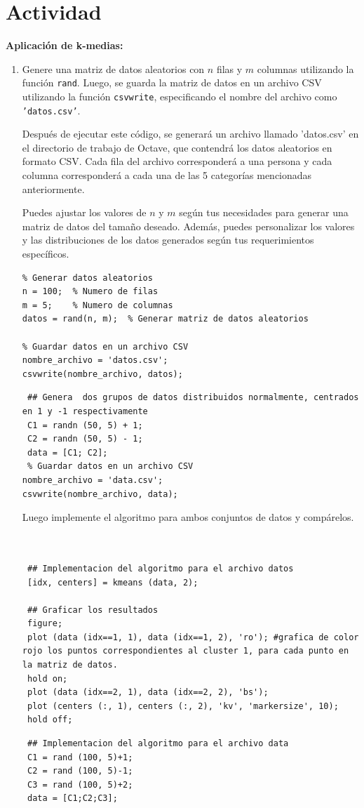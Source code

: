 \documentclass[12pt]{article}
\theoremstyle{exampstyle}
\theoremstyle{definition}
\theoremstyle{break}
\numberwithin{equation}{section}
\begin{document}
\section*{Actividad}
{\bf Aplicación de k-medias:}
\begin{enumerate}
    \item Genere una matriz de datos aleatorios con $n$ filas y $m$ columnas utilizando la función \texttt{rand}. Luego, se guarda la matriz de datos en un archivo CSV utilizando la función \texttt{csvwrite}, especificando el nombre del archivo como \texttt{'datos.csv'}.

Después de ejecutar este código, se generará un archivo llamado 'datos.csv' en el directorio de trabajo de Octave, que contendrá los datos aleatorios en formato CSV. Cada fila del archivo corresponder\'a a una persona y cada columna corresponder\'a a cada una de las 5 categor\'ias mencionadas anteriormente.

Puedes ajustar los valores de $n$ y $m$ según tus necesidades para generar una matriz de datos del tamaño deseado. Además, puedes personalizar los valores y las distribuciones de los datos generados según tus requerimientos específicos.
    \begin{lstlisting}
% Generar datos aleatorios
n = 100;  % Numero de filas
m = 5;    % Numero de columnas
datos = rand(n, m);  % Generar matriz de datos aleatorios

% Guardar datos en un archivo CSV
nombre_archivo = 'datos.csv';
csvwrite(nombre_archivo, datos);
 \end{lstlisting}

 
    \begin{lstlisting}
 ## Genera  dos grupos de datos distribuidos normalmente, centrados en 1 y -1 respectivamente
 C1 = randn (50, 5) + 1;
 C2 = randn (50, 5) - 1;
 data = [C1; C2];
 % Guardar datos en un archivo CSV
nombre_archivo = 'data.csv';
csvwrite(nombre_archivo, data);
 \end{lstlisting}
 Luego implemente el algoritmo para ambos conjuntos de datos y comp\'arelos.

 \begin{lstlisting}


 ## Implementacion del algoritmo para el archivo datos
 [idx, centers] = kmeans (data, 2);

 ## Graficar los resultados
 figure;
 plot (data (idx==1, 1), data (idx==1, 2), 'ro'); #grafica de color rojo los puntos correspondientes al cluster 1, para cada punto en la matriz de datos.
 hold on;
 plot (data (idx==2, 1), data (idx==2, 2), 'bs');
 plot (centers (:, 1), centers (:, 2), 'kv', 'markersize', 10);
 hold off;
\end{lstlisting}
\begin{lstlisting}
 ## Implementacion del algoritmo para el archivo data
 C1 = rand (100, 5)+1;
 C2 = rand (100, 5)-1;
 C3 = rand (100, 5)+2;
 data = [C1;C2;C3];


\end{lstlisting}
\end{enumerate}
\end{document}
